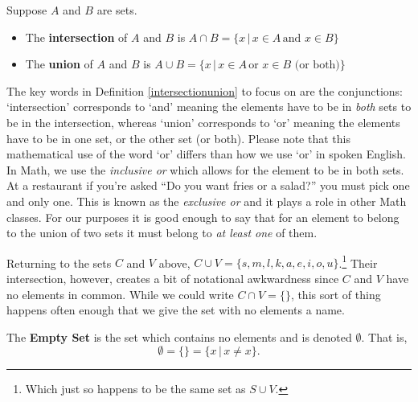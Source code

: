 \documentclass{ximera}
\begin{document}
\medskip

\colorbox{ResultColor}{\bbm

\begin{definition} \label{intersectionunion}  Suppose $A$ and $B$ are sets.

\begin{itemize}

\item The \textbf{intersection} of $A$ and $B$ is $A \cap B = \{ x \, | \, x \in A \, \text{and} \,\, x \in B \}$

\item The \textbf{union} of $A$ and $B$ is $A \cup B = \{ x \, | \, x \in A \, \text{or} \,\, x \in B \, \, \text{(or both)} \}$

\end{itemize}

\end{definition}

\ebm}

\medskip

The key words in Definition \ref{intersectionunion} to focus on are the conjunctions:  `intersection' corresponds to `and' meaning the elements have to be in \textit{both} sets to be in the intersection, whereas `union' corresponds to `or' meaning the elements have to be in one set, or the other set (or both).  Please note that this mathematical use of the word `or' differs than how we use `or' in spoken English.  In Math, we use the \emph{inclusive or} which allows for the element to be in both sets.  At a restaurant if you're asked ``Do you want fries or a salad?'' you must pick one and only one.  This is known as the \emph{exclusive or} and it plays a role in other Math classes.  For our purposes it is good enough to say that for an element to belong to the union of two sets it must belong to \textit{at least one} of them.

\smallskip

Returning to the sets $C$ and $V$  above, $C \cup V = \{ s, m, l, k, a, e, i, o, u\}$.\footnote{Which just so happens to be the same set as $S \cup V$.}  Their intersection, however, creates a bit of notational awkwardness since $C$ and $V$ have no elements in common.  While we could write $C \cap V = \{ \}$, this sort of thing happens often enough that we give the set with no elements a name. 

\medskip

\colorbox{ResultColor}{\bbm

\begin{definition} \label{emptysetdefn}

The \textbf{Empty Set} is the set which contains no elements and is denoted $\emptyset$.  That is, \[\emptyset=\{ \}=\{x\,|\,\mbox{$x \neq x$}\}.\]  

\end{definition}

\ebm}
\end{document}
